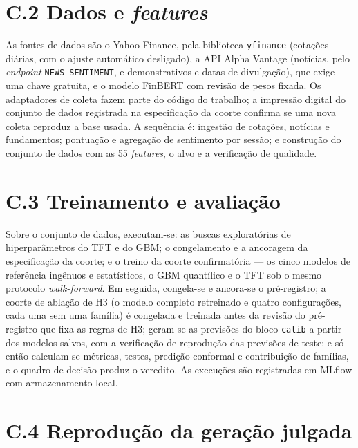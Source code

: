 \section*{C.2 Dados e \textit{features}}

As fontes de dados são o Yahoo Finance, pela biblioteca \texttt{yfinance} (cotações diárias, com o ajuste automático desligado), a API Alpha Vantage (notícias, pelo \textit{endpoint} \texttt{NEWS\_SENTIMENT}, e demonstrativos e datas de divulgação), que exige uma chave gratuita, e o modelo FinBERT com revisão de pesos fixada. Os adaptadores de coleta fazem parte do código do trabalho; a impressão digital do conjunto de dados registrada na especificação da coorte confirma se uma nova coleta reproduz a base usada. A sequência é: ingestão de cotações, notícias e fundamentos; pontuação e agregação de sentimento por sessão; e construção do conjunto de dados com as 55 \textit{features}, o alvo e a verificação de qualidade.

\section*{C.3 Treinamento e avaliação}

Sobre o conjunto de dados, executam-se: as buscas exploratórias de hiperparâmetros do TFT e do GBM; o congelamento e a ancoragem da especificação da coorte; e o treino da coorte confirmatória --- os cinco modelos de referência ingênuos e estatísticos, o GBM quantílico e o TFT sob o mesmo protocolo \textit{walk-forward}. Em seguida, congela-se e ancora-se o pré-registro; a coorte de ablação de H3 (o modelo completo retreinado e quatro configurações, cada uma sem uma família) é congelada e treinada antes da revisão do pré-registro que fixa as regras de H3; geram-se as previsões do bloco \texttt{calib} a partir dos modelos salvos, com a verificação de reprodução das previsões de teste; e só então calculam-se métricas, testes, predição conformal e contribuição de famílias, e o quadro de decisão produz o veredito. As execuções são registradas em MLflow com armazenamento local.

\section*{C.4 Reprodução da geração julgada}

